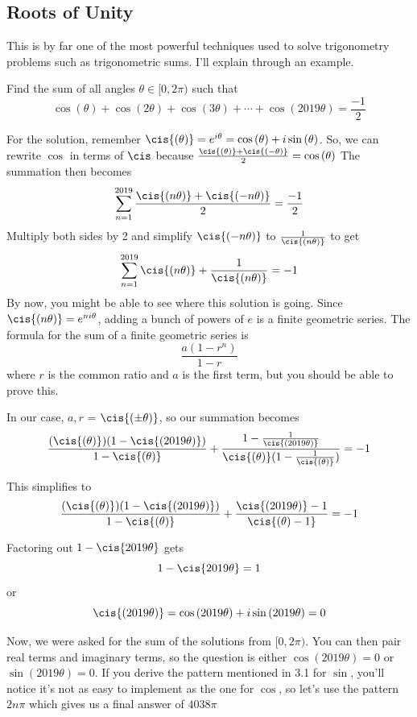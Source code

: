 \documentclass{article}
\begin{document}
\subsection{Roots of Unity}

This is by far one of the most powerful techniques used to solve trigonometry problems such as trigonometric sums. I'll explain through an example.
\begin{example}
\begin{problem}

Find the sum of all angles $\theta \in [0,2\pi)$ such that
$$\cos{(\theta)}+\cos{(2\theta)}+\cos{(3\theta)}+\cdots+\cos{(2019\theta)} = \frac{-1}{2}$$
\end{problem}

\noindent For the solution, remember $\cis{(\theta)}=e^{i\theta}=\cos{(\theta)}+i\sin{(\theta)}$. So, we can rewrite $\cos$ in terms of $\cis$ because $\frac{\cis{(\theta)}+\cis{(-\theta)}}{2}=\cos{(\theta)}$
The summation then becomes $$\sum_{n=1}^{2019}{\frac{\cis{(n\theta)}+\cis{(-n\theta)}}{2} = \frac{-1}{2}}$$
Multiply both sides by 2 and simplify $\cis{(-n\theta)}$ to $\frac{1}{\cis{(n\theta)}}$ to get $$\sum_{n=1}^{2019}{\cis{(n\theta)}+\frac{1}{\cis{(n\theta)}}} = -1$$
By now, you might be able to see where this solution is going. Since $\cis{(n\theta)} = e^{ni\theta}$, adding a bunch of powers of $e$ is a finite geometric series. The formula for the sum of a finite geometric series is $$\frac{a(1-r^n)}{1-r}$$ where $r$ is the common ratio and $a$ is the first term, but you should be able to prove this.

\vspace{5mm}
In our case, $a,r$ = $\cis{(\pm\theta)}$, so our summation becomes $$\frac{(\cis{(\theta)})(1-\cis{(2019\theta)})}{1-\cis{(\theta)}}+\frac{1-\frac{1}{\cis{(2019\theta)}}}{\cis{(\theta)}(1-\frac{1}{\cis{(\theta)}})}=-1$$

This simplifies to $$\frac{(\cis{(\theta)})(1-\cis{(2019\theta)})}{1-\cis{(\theta)}}+\frac{\cis{(2019\theta)}-1}{\cis{(\theta)-1}}=-1$$

Factoring out $1-\cis{2019\theta}$ gets $$1-\cis{2019\theta}=1$$ or $$\cis{(2019\theta)}=\cos{(2019\theta)}+i\sin{(2019\theta)}=0$$

\noindent Now, we were asked for the sum of the solutions from $[0,2\pi)$. You can then pair real terms and imaginary terms, so the question is either $\cos(2019\theta)=0$ or $\sin(2019\theta)=0$. If you derive the pattern mentioned in 3.1 for $\sin$, you'll notice it's not as easy to implement as the one for $\cos$, so let's use the pattern $2n\pi$ which gives us a final answer of $\boxed{4038\pi}$

\end{example}
\end{document}
